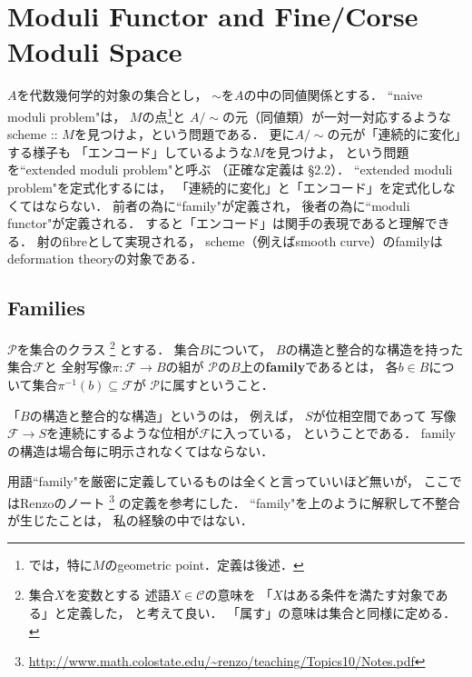\documentclass[a4paper]{jsarticle}
\newcommand{\famF}{\mathcal{F}}
\begin{document}
\section{Moduli Functor and Fine/Corse Moduli Space}
    $A$を代数幾何学的対象の集合とし，
    $\sim$を$A$の中の同値関係とする．
    ``naive moduli problem"は，
    $M$の点\footnote{ \cite{GIT}では，特に$M$のgeometric point．定義は後述． }と
    $A/\sim$の元（同値類）が一対一対応するような
    scheme :: $M$を見つけよ，という問題である．
    更に$A/\sim$の元が「連続的に変化」する様子も
    「エンコード」しているような$M$を見つけよ，
    という問題を``extended moduli problem"と呼ぶ
    （正確な定義は\cite{Hos} \S 2.2）．
    ``extended moduli problem"を定式化するには，
    「連続的に変化」と「エンコード」を定式化しなくてはならない．
    前者の為に``family"が定義され，
    後者の為に``moduli functor"が定義される．
    すると「エンコード」は関手の表現であると理解できる．
        射のfibreとして実現される，
        scheme（例えばsmooth curve）のfamilyは
        deformation theoryの対象である．

    \subsection{Families}
    \begin{Def}
        $\mathcal{P}$を集合のクラス
        \footnote
        {
            集合$X$を変数とする
            述語$X \in \mathcal{C}$の意味を
            「$X$はある条件を満たす対象である」と定義した，
            と考えて良い．
            「属す」の意味は集合と同様に定める．
        }
        とする．
        集合$B$について，
        $B$の構造と整合的な構造を持った集合$\famF$と
        全射写像$\pi: \famF \to B$の組が
        $\mathcal{P}$の$B$上の\textbf{family}であるとは，
        各$b \in B$について集合$\pi^{-1}(b) \subseteq \famF$が
        $\mathcal{P}$に属すということ．
    \end{Def}
    「$B$の構造と整合的な構造」というのは，
    例えば，
    $S$が位相空間であって
    写像$\famF \to S$を連続にするような位相が$\famF$に入っている，
    ということである．
    familyの構造は場合毎に明示されなくてはならない．

    用語``family"を厳密に定義しているものは全くと言っていいほど無いが，
    ここではRenzoのノート
    \footnote{ \url{http://www.math.colostate.edu/~renzo/teaching/Topics10/Notes.pdf} }
    の定義を参考にした．
    ``family"を上のように解釈して不整合が生じたことは，
    私の経験の中ではない．
\end{document}
